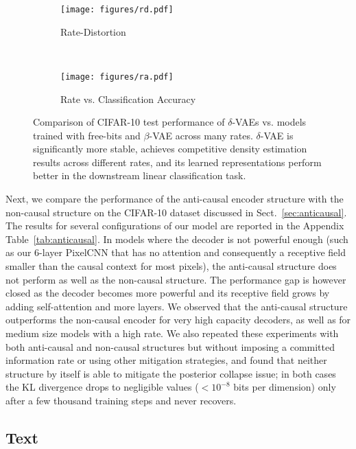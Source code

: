 \documentclass{article} \usepackage{iclr2019_conference,times}
\newcommand{\tblref}[1]{Table~\ref{#1}}
\newcommand{\sref}[1]{Sect.~\ref{#1}}
\begin{document}
\begin{figure}[h]
    \vspace{-1cm}
    \centering
    \begin{subfigure}{0.49\textwidth}
        \centering
        \texttt{[image: figures/rd.pdf]}
        \caption{Rate-Distortion}        
        \label{fig:rd}
    \end{subfigure}
    ~
    \begin{subfigure}{0.49\textwidth}
        \centering
        \texttt{[image: figures/ra.pdf]}
        \caption{Rate vs. Classification Accuracy}
        \label{fig:ra}
    \end{subfigure}
    \caption{Comparison of CIFAR-10 test performance of $\delta$-VAEs vs. models trained with free-bits and $\beta$-VAE across many rates. $\delta$-VAE is significantly more stable, achieves competitive density estimation results across different rates, and its learned representations perform better in the downstream linear classification task.} 
    \label{fig:rda}
\end{figure}

Next, we compare the performance of the anti-causal encoder structure with the non-causal structure on the CIFAR-10 dataset discussed in \sref{sec:anticausal}. The results for several configurations of our model are reported in the Appendix \tblref{tab:anticausal}. 
In  models where the decoder is not powerful enough (such as our 6-layer PixelCNN that has no attention and consequently a receptive field smaller than the causal context for most pixels), the anti-causal structure does not perform as well as the non-causal structure. The performance gap is however closed as the decoder becomes more powerful and its receptive field grows by adding self-attention and more layers. We observed that the anti-causal structure outperforms the non-causal encoder for very high capacity decoders, as well as for medium size models with a high rate. We also repeated these experiments with both anti-causal and non-causal structures
but without imposing a committed information rate or using other mitigation strategies, and found that neither structure by itself is able to mitigate the posterior collapse issue; in both cases the KL divergence drops to negligible values ($< 10^{-8}$ bits per dimension) only after a few thousand training steps and never recovers. 


\subsection{Text}
\end{document}
